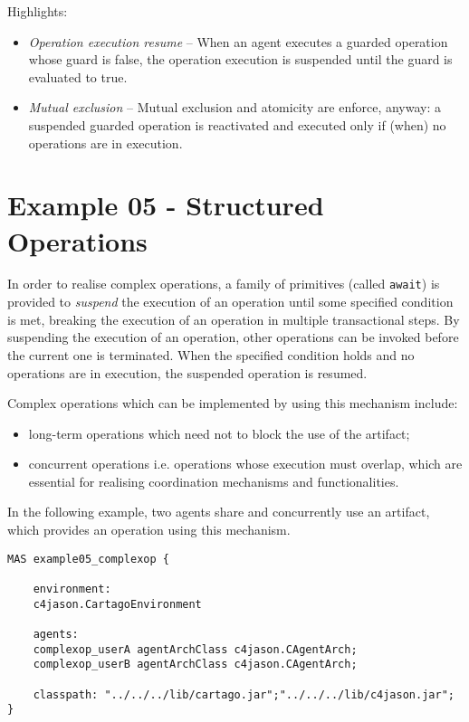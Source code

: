 \documentclass[11pt]{report}
\newcommand\code[1]{{\small{\mbox{\texttt{{#1}}}}}}
\begin{document}
\noindent Highlights:
\begin{itemize}
\item \emph{Operation execution resume} -- When an agent executes a guarded operation whose guard is false, the operation execution is suspended until the guard is evaluated to true.
%
\item \emph{Mutual exclusion} -- Mutual exclusion and atomicity are enforce, anyway:  a suspended guarded operation is  reactivated and executed only if (when) no operations are in execution.
\end{itemize} 


\newpage
\section{Example 05 - Structured Operations}

In order to realise  complex operations, a family of primitives (called \code{await}) is provided to \emph{suspend} the execution of an operation until some specified condition is met, breaking the execution of an operation in multiple transactional steps.
%
By suspending the execution of an operation, other operations can be invoked before the current one is terminated.
%
When the specified condition holds and no operations are in execution, the suspended operation is resumed.

Complex operations which can be implemented by using this mechanism include:
\begin{itemize}
\item long-term operations which need not to block the use of the artifact;
\item concurrent operations i.e. operations whose execution must overlap,  which are essential for realising coordination mechanisms and functionalities.
\end{itemize}

\noindent In the following example, two agents share and concurrently use an artifact, which provides an  operation using this mechanism.
% 
{\small{
\begin{verbatim}
MAS example05_complexop {

    environment: 
    c4jason.CartagoEnvironment

    agents:     	  
    complexop_userA agentArchClass c4jason.CAgentArch;
    complexop_userB agentArchClass c4jason.CAgentArch;

    classpath: "../../../lib/cartago.jar";"../../../lib/c4jason.jar";    
}
\end{verbatim}}}
\end{document}
